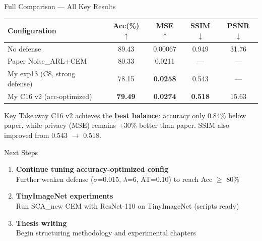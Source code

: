 \documentclass[aspectratio=169, 10pt]{beamer}
\newcommand{\good}[1]{\textcolor{goodgreen}{#1}}
\begin{document}
\begin{frame}{Full Comparison --- All Key Results}

\begin{center}
\renewcommand{\arraystretch}{1.2}
\begin{tabular}{l c c c c}
\toprule
\textbf{Configuration} & \textbf{Acc(\%)} $\uparrow$ & \textbf{MSE} $\uparrow$ & \textbf{SSIM} $\downarrow$ & \textbf{PSNR} $\downarrow$ \\
\midrule
No defense & 89.43 & 0.00067 & 0.949 & 31.76 \\
\hdashline
Paper Noise\_ARL+CEM & 80.33 & 0.0211 & --- & --- \\
\hdashline
My exp13 (C8, strong defense) & 78.15 & \good{\textbf{0.0258}} & 0.543 & --- \\
\rowcolor{green!10}
My C16 v2 (acc-optimized) & \good{\textbf{79.49}} & \good{\textbf{0.0274}} & \good{\textbf{0.518}} & 15.63 \\
\bottomrule
\end{tabular}
\end{center}

\vspace{0.3cm}

\begin{alertblock}{Key Takeaway}
\small
C16 v2 achieves the \textbf{best balance}: accuracy only 0.84\% below paper, while privacy (MSE) remains \good{+30\%} better than paper. SSIM also improved from 0.543 $\to$ \good{0.518}.
\end{alertblock}

\end{frame}

\begin{frame}{Next Steps}

\begin{enumerate}\setlength{\itemsep}{10pt}
    \item \textbf{Continue tuning accuracy-optimized config}\\
    {\small Further weaken defense ($\sigma$=0.015, $\lambda$=6, AT=0.10) to reach Acc $\geq$ 80\%}

    \item \textbf{TinyImageNet experiments}\\
    {\small Run SCA\_new CEM with ResNet-110 on TinyImageNet (scripts ready)}

    \item \textbf{Thesis writing}\\
    {\small Begin structuring methodology and experimental chapters}
\end{enumerate}

\end{frame}
\end{document}
